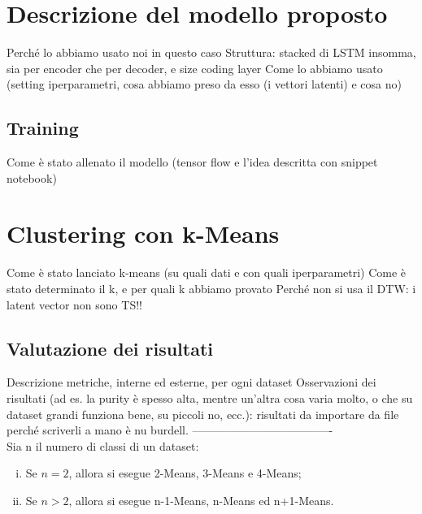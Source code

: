 \section{Descrizione del modello proposto}
Perché lo abbiamo usato noi in questo caso
Struttura: stacked di LSTM insomma, sia per encoder che per decoder, e size coding layer
Come lo abbiamo usato (setting iperparametri, cosa abbiamo preso da esso (i vettori latenti) e cosa no)

\subsection{Training}
Come è stato allenato il modello (tensor flow e l'idea descritta con snippet notebook)

\section{Clustering con k-Means}
Come è stato lanciato k-means (su quali dati e con quali iperparametri)
Come è stato determinato il k, e per quali k abbiamo provato
Perché non si usa il DTW: i latent vector non sono TS!!

\subsection{Valutazione dei risultati}
Descrizione metriche, interne ed esterne, per ogni dataset
Osservazioni dei risultati (ad es. la purity è spesso alta, mentre un'altra cosa varia molto, o che su dataset grandi funziona bene, su piccoli no, ecc.): risultati da importare da file perché scriverli a mano è nu burdell.
-------------------------------------\\

Sia n il numero di classi di un dataset:
\begin{enumerate}[(i)]
	\item Se $n=2$, allora si esegue 2-Means, 3-Means e 4-Means;
	\item Se $n>2$, allora si esegue n-1-Means, n-Means ed n+1-Means.
\end{enumerate}

